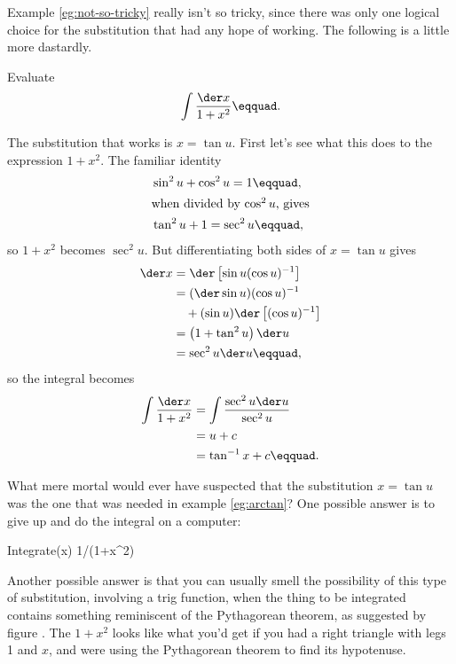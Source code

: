 Example \ref{eg:not-so-tricky} really isn't so tricky, since there was only one logical
choice for the substitution that had any hope of working. The following is a little more
dastardly.

\begin{eg}\label{eg:arctan}
\egquestion Evaluate
\begin{equation*}
  \int \frac{\der x}{1+x^2}\eqquad.
\end{equation*}

\eganswer The substitution that works is $x=\tan u$. First let's see what this does
to the expression $1+x^2$. The familiar identity
\begin{align*}
   &\sin^2 u + \cos^2 u = 1\eqquad,\\
\intertext{when divided by $\cos^2 u$, gives}
   &\tan^2 u + 1 = \sec^2 u\eqquad,
\end{align*}
so $1+x^2$ becomes $\sec^2 u$.
But differentiating both sides of $x=\tan u$ gives
\begin{align*}
  \der x &= \der \left[\sin u(\cos u)^{-1}\right] \\
         &= (\der\sin u)(\cos u)^{-1}\\
         &  \quad +(\sin u)\der\left[(\cos u)^{-1}\right] \\
         &= \left(1+\tan^2 u\right)\der u \\
         &= \sec^2 u\der u\eqquad, 
\end{align*}
so the integral becomes
\begin{align*}
  \int \frac{\der x}{1+x^2} &= \int \frac{\sec^2 u \der u}{\sec^2 u} \\
           &= u+c \\
           &= \tan^{-1} x+c\eqquad.
\end{align*}
\end{eg}
%
What mere mortal would ever have suspected that the substitution $x=\tan u$ was
the one that was needed in example \ref{eg:arctan}? One possible answer is to
give up and do the integral on a computer:

\begin{Code}
  \ii Integrate(x) 1/(1+x^2)
\end{Code}

Another possible answer is that you can usually smell the possibility of
this type of substitution, involving a trig function, when the thing to be
integrated contains something reminiscent of the Pythagorean theorem, as
suggested by figure . The $1+x^2$ looks like what
you'd get if you had a right triangle with legs 1 and $x$, and were using the
Pythagorean theorem to find its hypotenuse.
%

